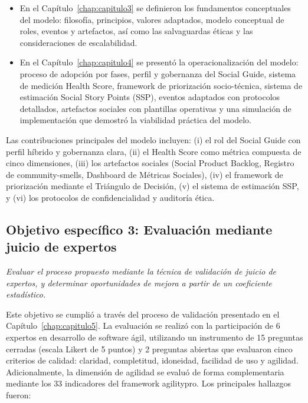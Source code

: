 \begin{itemize}
    \item En el Capítulo~\ref{chap:capitulo3} se definieron los fundamentos conceptuales del modelo: filosofía, principios, valores adaptados, modelo conceptual de roles, eventos y artefactos, así como las salvaguardas éticas y las consideraciones de escalabilidad.
    \item En el Capítulo~\ref{chap:capitulo4} se presentó la operacionalización del modelo: proceso de adopción por fases, perfil y gobernanza del Social Guide, sistema de medición Health Score, framework de priorización socio-técnica, sistema de estimación Social Story Points (SSP), eventos adaptados con protocolos detallados, artefactos sociales con plantillas operativas y una simulación de implementación que demostró la viabilidad práctica del modelo.
\end{itemize}

Las contribuciones principales del modelo incluyen: (i) el rol del Social Guide con perfil híbrido y gobernanza clara, (ii) el Health Score como métrica compuesta de cinco dimensiones, (iii) los artefactos sociales (Social Product Backlog, Registro de \gls{community-smells}, Dashboard de Métricas Sociales), (iv) el framework de priorización mediante el Triángulo de Decisión, (v) el sistema de estimación SSP, y (vi) los protocolos de confidencialidad y auditoría ética.

\subsection{Objetivo específico 3: Evaluación mediante juicio de expertos}

\textit{Evaluar el proceso propuesto mediante la técnica de validación de juicio de expertos, y determinar oportunidades de mejora a partir de un coeficiente estadístico.}

Este objetivo se cumplió a través del proceso de validación presentado en el Capítulo~\ref{chap:capitulo5}. La evaluación se realizó con la participación de 6 expertos en desarrollo de software ágil, utilizando un instrumento de 15 preguntas cerradas (escala Likert de 5 puntos) y 2 preguntas abiertas que evaluaron cinco criterios de calidad: claridad, completitud, idoneidad, facilidad de uso y agilidad. Adicionalmente, la dimensión de agilidad se evaluó de forma complementaria mediante los 33 indicadores del framework \gls{agilitypro}. Los principales hallazgos fueron:

